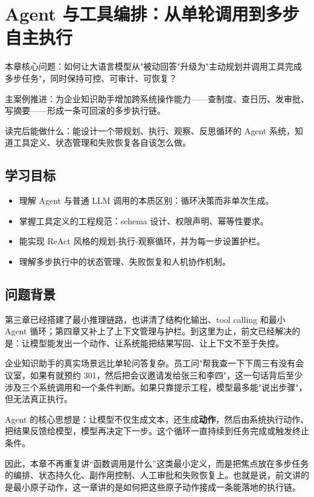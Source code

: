 \chapter{Agent 与工具编排：从单轮调用到多步自主执行}

\begin{introduction}
\item {\heiti 本章核心问题}：如何让大语言模型从"被动回答"升级为"主动规划并调用工具完成多步任务"，同时保持可控、可审计、可恢复？
\item {\heiti 主案例推进}：为企业知识助手增加跨系统操作能力——查制度、查日历、发审批、写摘要——形成一条可回滚的多步执行链。
\item {\heiti 读完后能做什么}：能设计一个带规划、执行、观察、反思循环的 Agent 系统，知道工具定义、状态管理和失败恢复各自该怎么做。
\end{introduction}

\section{学习目标}
\begin{itemize}
  \item 理解 Agent 与普通 LLM 调用的本质区别：循环决策而非单次生成。
  \item 掌握工具定义的工程规范：schema 设计、权限声明、幂等性要求。
  \item 能实现 ReAct 风格的规划-执行-观察循环，并为每一步设置护栏。
  \item 理解多步执行中的状态管理、失败恢复和人机协作机制。
\end{itemize}

\section{问题背景}
第三章已经搭建了最小推理链路，也讲清了结构化输出、tool calling 和最小 Agent 循环；第四章又补上了上下文管理与护栏。到这里为止，前文已经解决的是：让模型能发出一个动作、让系统能把结果写回、让上下文不至于失控。

企业知识助手的真实场景远比单轮问答复杂。员工问"帮我查一下下周三有没有会议室，如果有就预约 301，然后把会议邀请发给张三和李四"，这一句话背后至少涉及三个系统调用和一个条件判断。如果只靠提示工程，模型最多能"说出步骤"，但无法真正执行。

Agent 的核心思想是：让模型不仅生成文本，还生成\textbf{动作}，然后由系统执行动作、把结果反馈给模型，模型再决定下一步。这个循环一直持续到任务完成或触发终止条件。

因此，本章不再重复讲“函数调用是什么”这类最小定义，而是把焦点放在多步任务的编排、状态持久化、副作用控制、人工审批和失败恢复上。也就是说，前文讲的是最小原子动作，这一章讲的是{\heiti 如何把这些原子动作接成一条能落地的执行链。}

